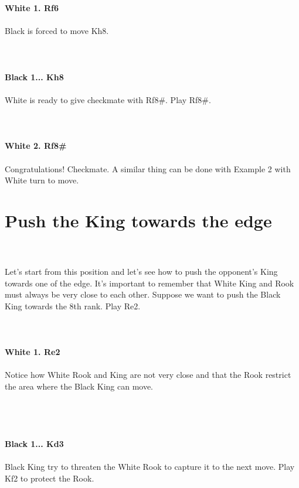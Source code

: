\documentclass{article}
\begin{document}
\\
\\
\textbf{White 1. Rf6}\\
\\
Black is forced to move Kh8.\\
\\

\\
\\
\textbf{Black 1... Kh8}\\
\\
White is ready to give checkmate with Rf8\#. Play Rf8\#.\\
\\

\\
\\
\textbf{White 2. Rf8\#}\\
\\
Congratulations! Checkmate. A similar thing can be done with Example 2 with White turn to move.\section{ Push the King towards the edge}

\\
\\
Let's start from this position and let's see how to push the opponent's King towards one of the edge. It's important to remember that White King and Rook must always be very close to each other. Suppose we want to push the Black King towards the 8th rank. Play Re2.\\
\\

\\
\\
\textbf{White 1. Re2}\\
\\
Notice how White Rook and King are not very close and that the Rook restrict the area where the Black King can move.\\\\
\\

\\
\\
\textbf{Black 1... Kd3}\\
\\
Black King try to threaten the White Rook to capture it to the next move. Play Kf2 to protect the Rook.\\\\
\end{document}
